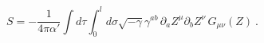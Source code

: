 \begin{equation}
\label{eq:string action}
  S=-\frac{1}{4\pi\alpha'}
       \int d\tau \int_0^l d\sigma
       \sqrt{-\gamma}\gamma^{ab} \,
       \partial_a Z^\mu \partial_b Z^\nu \, G_{\mu\nu}(Z) \ .
\end{equation}

